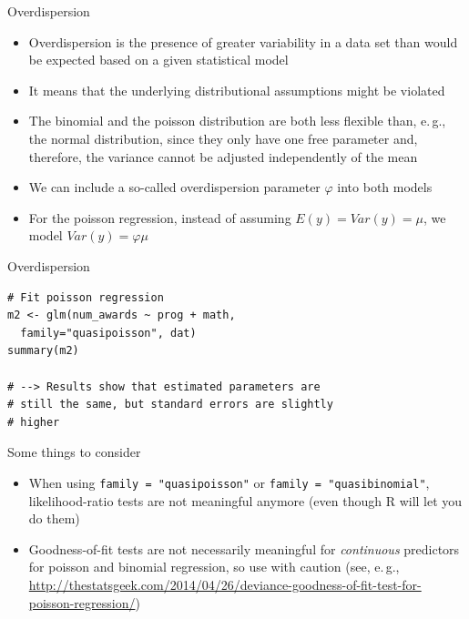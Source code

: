 \documentclass[aspectratio=169]{beamer}
\begin{document}
\begin{frame}{Overdispersion}
  \begin{itemize}
    \item Overdispersion is the presence of greater variability in a data
      set than would be expected based on a given statistical model
    \item It means that the underlying distributional assumptions might be
      violated
    \item The binomial and the poisson distribution are both less flexible
      than, e.\,g., the normal distribution, since they only have one free
      parameter and, therefore, the variance cannot be adjusted
      independently of the mean
    \item We can include a so-called overdispersion parameter $\varphi$
      into both models
    \item For the poisson regression, instead of assuming $E(y) = Var(y) =
      \mu$, we model $Var(y) = \varphi\mu$
  \end{itemize}
\end{frame}

\begin{frame}[fragile]{Overdispersion}
\begin{lstlisting}
# Fit poisson regression
m2 <- glm(num_awards ~ prog + math,
  family="quasipoisson", dat)
summary(m2)

# --> Results show that estimated parameters are
# still the same, but standard errors are slightly
# higher
\end{lstlisting}
\end{frame}

\begin{frame}{Some things to consider}
  \begin{itemize}
    \item When using \texttt{family = "quasipoisson"} or \texttt{family =
      "quasibinomial"}, likelihood-ratio tests are not meaningful anymore
      (even though R will let you do them)
    \item Goodness-of-fit tests are not necessarily meaningful for
      \emph{continuous} predictors for poisson and binomial regression, so
      use with caution
      (see, e.\,g.,
      \url{http://thestatsgeek.com/2014/04/26/deviance-goodness-of-fit-test-for-poisson-regression/})
  \end{itemize}
\end{frame}

%
\end{document}
